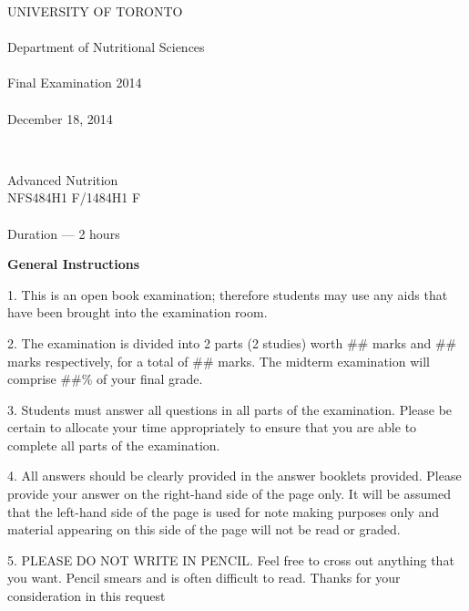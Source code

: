 
\begin{center}
\bfseries{
UNIVERSITY OF TORONTO
\\~\\
Department of Nutritional Sciences
\\~\\
Final Examination 2014
\\~\\
December 18, 2014

~~

Advanced Nutrition \\
NFS484H1 F/1484H1 F
\\~\\
Duration --- 2 hours}
\end{center}


\vspace{2.75cm}

\textbf{General Instructions}

1. This is an open book examination; therefore students may use any
   aids that have been brought into the examination room.
   
2. The examination is divided into 2 parts (2 studies) worth \#\# marks
   and \#\# marks respectively, for a total of \#\# marks.  The midterm
   examination will comprise \#\#\% of your final grade.

3. Students must answer all questions in all parts of the examination.
   Please be certain to allocate your time appropriately to ensure
   that you are able to complete all parts of the examination.

4. All answers should be clearly provided in the answer booklets
   provided.  Please provide your answer on the right-hand side of the
   page only.  It will be assumed that the left-hand side of the page
   is used for note making purposes only and material appearing on
   this side of the page will not be read or graded.

5. PLEASE DO NOT WRITE IN PENCIL.  Feel free to cross out anything
   that you want.  Pencil smears and is often difficult to read.
   Thanks for your consideration in this request

\newpage\newpage
